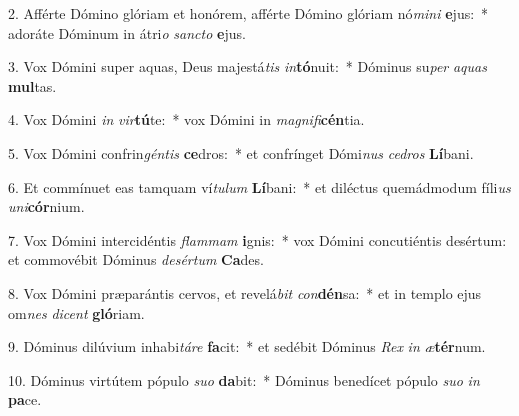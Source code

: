 2. Afférte Dómino glóriam et honórem, afférte Dómino glóriam nó\textit{mi}\textit{ni} \textbf{e}jus:~*  adoráte Dóminum in átri\textit{o} \textit{sanc}\textit{to} \textbf{e}jus.\

3. Vox Dómini super aquas, Deus majestá\textit{tis} \textit{in}\textbf{tó}nuit:~*  Dóminus su\textit{per} \textit{a}\textit{quas} \textbf{mul}tas.\

4. Vox Dómini \textit{in} \textit{vir}\textbf{tú}te:~*  vox Dómini in \textit{ma}\textit{gni}\textit{fi}\textbf{cén}tia.\

5. Vox Dómini confrin\textit{gén}\textit{tis} \textbf{ce}dros:~*  et confrínget Dómi\textit{nus} \textit{ce}\textit{dros} \textbf{Lí}bani.\

6. Et commínuet eas tamquam ví\textit{tu}\textit{lum} \textbf{Lí}bani:~*  et diléctus quemádmodum fíli\textit{us} \textit{u}\textit{ni}\textbf{cór}nium.\

7. Vox Dómini intercidéntis \textit{flam}\textit{mam} \textbf{i}gnis:~*  vox Dómini concutiéntis desértum: et commovébit Dóminus \textit{de}\textit{sér}\textit{tum} \textbf{Ca}des.\

8. Vox Dómini præparántis cervos, et revelá\textit{bit} \textit{con}\textbf{dén}sa:~*  et in templo ejus om\textit{nes} \textit{di}\textit{cent} \textbf{gló}riam.\

9. Dóminus dilúvium inhabi\textit{tá}\textit{re} \textbf{fa}cit:~*  et sedébit Dóminus \textit{Rex} \textit{in} \textit{æ}\textbf{tér}num.\

10. Dóminus virtútem pópulo \textit{su}\textit{o} \textbf{da}bit:~*  Dóminus benedícet pópulo \textit{su}\textit{o} \textit{in} \textbf{pa}ce.\

